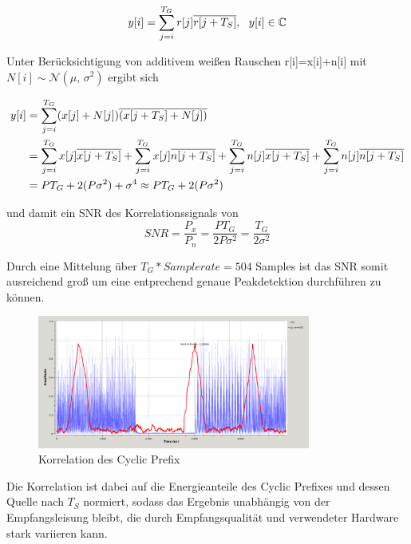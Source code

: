 \begin{equation}
y[i] = \sum \limits_{j=i}^{T_G}r[j] \overline{r[j+T_S]}, \ \ y[i] \in \mathbb{C}
\label{eq:corr_einfach}
\end{equation}

Unter Berücksichtigung von additivem weißen Rauschen r[i]=x[i]+n[i] mit $N[i] \sim \mathcal{N}(\mu,\,\sigma^{2})$ ergibt sich

\begin{equation}
    \begin{aligned}
y[i] &= \sum \limits_{j=i}^{T_G}(x[j]+N[j]) \overline{(x[j+T_S]+N[j])} \\
&= \sum \limits_{j=i}^{T_G}x[j] \overline{x[j+T_S]} + \sum \limits_{j=i}^{T_G}x[j] \overline{n[j+T_S]} + \sum \limits_{j=i}^{T_G}n[j] \overline{x[j+T_S]} + \sum \limits_{j=i}^{T_G}n[j] \overline{n[j+T_S]} \\
&= P T_G + 2(P \sigma^2) + \sigma^4 \approx P T_G + 2(P \sigma^2)
    \end{aligned}
\end{equation}

und damit ein SNR des Korrelationssignals von
\begin{equation}
SNR = \frac{P_x}{P_n} = \frac{P T_G}{2 P \sigma^2} = \frac{T_G}{2 \sigma^2}
\end{equation}

Durch eine Mittelung über $T_G * Samplerate = 504$ Samples ist das SNR somit ausreichend groß um eine entprechend genaue Peakdetektion durchführen zu können.

\begin{figure}[ht]
\centering
  \includegraphics[width=0.8\textwidth]{figures/delayed_correlation_abs_and_energy.png}
	\caption{Korrelation des Cyclic Prefix}
	\label{fig:corr}
\end{figure}

Die Korrelation ist dabei auf die Energieanteile des Cyclic Prefixes und dessen Quelle nach $T_S$ normiert, sodass das Ergebnis unabhängig von der Empfangsleisung bleibt, die durch Empfangsqualität und verwendeter Hardware stark variieren kann.

